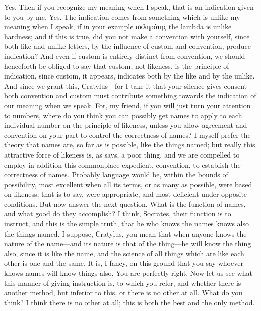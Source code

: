 {{{{{\cratylusspeaks
Yes.
\socratesspeaks
Then if you recognize my meaning when I speak, that is an indication given to you by me.
\cratylusspeaks
Yes.
\socratesspeaks
The indication comes from something which is unlike my meaning when I speak, if in your example σκληρότης the lambda is unlike hardness; and if this is true, did you not make a convention with yourself, since both like and unlike letters, by the influence of custom and convention, produce indication? And even if custom is entirely distinct from convention,  we should henceforth be obliged to say that custom, not likeness, is the principle of indication, since custom, it appears, indicates both by the like and by the unlike. And since we grant this, Cratylus—for I take it that your silence gives consent—both convention and custom must contribute something towards the indication of our meaning when we speak. For, my friend, if you will just turn your attention to numbers, where do you think you can possibly get names to apply to each individual number on the principle of likeness,  unless you allow agreement and convention on your part to control the correctness of names? I myself prefer the theory that names are, so far as is possible, like the things named; but really this attractive force of likeness is, as \hermogenesspeaks says, a poor thing, and we are compelled to employ in addition this commonplace expedient, convention, to establish the correctness of names. Probably language would be, within the bounds of possibility, most excellent when all its terms, or as many as possible, were based on likeness, that is to say, were appropriate, and most deficient under opposite conditions.  But now answer the next question. What is the function of names, and what good do they accomplish?
\cratylusspeaks
I think, Socrates, their function is to instruct, and this is the simple truth, that he who knows the names knows also the things named.
\socratesspeaks
I suppose, Cratylus, you mean that when anyone knows the nature of the name—and its nature is that of the thing—he will know the thing also,  since it is like the name, and the science of all things which are like each other is one and the same. It is, I fancy, on this ground that you say whoever knows names will know things also.
\cratylusspeaks
You are perfectly right.
\socratesspeaks
Now let us see what this manner of giving instruction is, to which you refer, and whether there is another method, but inferior to this, or there is no other at all. What do you think? 
\cratylusspeaks
I think there is no other at all; this is both the best and the only method.
}}}}}
